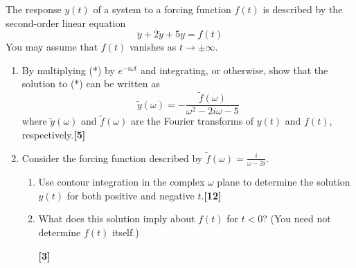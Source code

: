 \documentclass[a4paper]{article}
\begin{document}
\begin{qns}
The response $y(t)$ of a system to a forcing function $f(t)$ is described by the second-order linear equation
\begin{equation}
    \ddot{y}+2\dot{y}+5y=f(t)\tag{*}
\end{equation}
You may assume that $f(t)$ vanishes as $t\rightarrow\pm\infty$.
\begin{enumerate}[label=(\alph*)]
\item By multiplying (*) by $e^{-i\omega t}$ and integrating, or otherwise, show that the solution to (*) can be written as
$$\tilde{y}(\omega)=-\frac{\tilde{f}(\omega)}{\omega^2-2i\omega -5}$$
where $\tilde{y}(\omega)$ and $\tilde{f}(\omega)$ are the Fourier transforms of $y(t)$ and $f(t)$, respectively.\hfill\textbf{[5]}
\item Consider the forcing function described by $\tilde{f}(\omega)=\frac{i}{\omega-2i}$.
\begin{enumerate}[label=(\roman*)]
\item Use contour integration in the complex $\omega$ plane to determine the solution $y(t)$ for both positive and negative $t$.\hfill\textbf{[12]}
\item What does this solution imply about $f(t)$ for $t < 0$? (You need not determine $f(t)$ itself.)

\hfill\textbf{[3]}
\end{enumerate}
\end{enumerate}
\end{qns}
\end{document}
